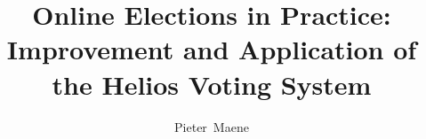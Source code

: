 \documentclass[journal]{IEEEtran}
\begin{document}
  \title{Online Elections in Practice: Improvement and Application of the Helios Voting System}
  \author{Pieter~Maene}

  \maketitle
  
  \begin{abstract}
  \end{abstract}
  
  
  
  
  
  
  
  
  
\end{document}
